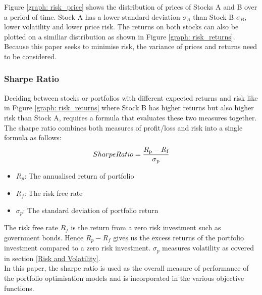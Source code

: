 \documentclass[a4paper,12pt]{report}
\numberwithin{equation}{section}
\theoremstyle{definition}
\begin{document}
Figure \ref{graph: risk_price} shows the distribution of prices of Stocks A and B over a period of time. Stock A has a lower standard deviation $\sigma_A$ than Stock B $\sigma_B$, lower volatility and lower price risk.  The returns on both stocks can also be plotted on a similiar distribution as shown in Figure \ref{graph: risk_returns}. Because this paper seeks to minimise risk, the variance of prices and returns need to be considered.

\subsubsection{Sharpe Ratio}
Deciding between stocks or portfolios with different expected returns and risk like in Figure \ref{graph: risk_returns} where Stock B has higher returns but also higher risk than Stock A, requires a formula that evaluates these two measures together. The sharpe ratio combines both measures of profit/loss and risk into a single formula as follows:
\begin{equation*}
  Sharpe Ratio = \frac{R\textsubscript{p}-R\textsubscript{f}}{\sigma\textsubscript{p}}
\end{equation*}
\begin{itemize}
  \item {$R_p$: The annualised return of portfolio}
  \item {$R_f$: The risk free rate}
  \item {$\sigma_p$: The standard deviation of portfolio return}
\end{itemize}
The risk free rate $R_f$ is the return from a zero risk investment such as government bonds. Hence $R_p - R_f$ gives us the excess returns of the portfolio investment compared to a zero risk investment. $\sigma_p$ measures volatility as covered in section \ref{Risk and Volatility}. 
\\

In this paper, the sharpe ratio is used as the overall measure of performance of the portfolio optimisation models and is incorporated in the various objective functions. 
\end{document}
